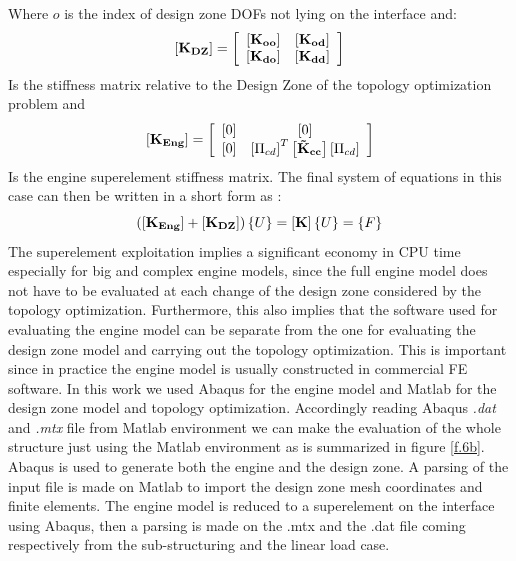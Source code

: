 Where $o$ is the index of design zone DOFs not lying on the interface and:
\begin{equation}
\left[{\mathbf{K_{DZ}}}\right]=\left[ \begin{array}{cc}
    \left[ \mathbf{K_{oo}} \right] & \left[ \mathbf{K_{od}} \right]\\
    \left[ \mathbf{K_{do}} \right] & \left[ \mathbf{K_{dd}} \right] 
    \end{array} \right] 
\end{equation}
Is the stiffness matrix relative to the Design Zone of the topology optimization problem and
\begin{equation}
\left[{\mathbf{K_{Eng}}}\right]=\left[ \begin{array}{cc}
    \left[ 0 \right] & \left[ 0 \right]\\
    \left[ 0 \right] & \left[ \Pi_{cd} \right]^T\left[ \mathbf{\tilde{K}_{cc}} \right]\left[ \Pi_{cd} \right] 
    \end{array} \right] 
\end{equation} 
Is the engine superelement stiffness matrix.
The final system of equations in this case can then be written in a short form as :
\begin{equation}
\left(\left[{\mathbf{K_{Eng}}}\right]+\left[{\mathbf{K_{DZ}}}\right]\right)\left\lbrace{U}\right \rbrace=\left[{\mathbf{K}}\right]\left\lbrace{U}\right \rbrace=\left\lbrace{F}\right \rbrace
\end{equation}
The superelement exploitation implies a significant economy in CPU time especially for big and complex engine models, since the full engine model does not have to be evaluated at each change of the design zone considered by the topology optimization. Furthermore, this also implies that the software used for evaluating the engine model can be separate from the one for evaluating the design zone model and carrying out the topology optimization. This is important since in practice the engine model is usually constructed in commercial FE software. In this work we used Abaqus for the engine model and Matlab for the design zone model and topology optimization. Accordingly reading Abaqus \textit{.dat} and \textit{.mtx} file from Matlab environment we can make the evaluation of the whole structure just using the Matlab environment as is summarized in figure \ref{f.6b}. Abaqus is used to generate both the engine and the design zone. A parsing of the input file is made on Matlab to import the design zone mesh coordinates and finite elements. The engine model is reduced to a superelement on the interface using Abaqus, then a parsing is made on the .mtx and the .dat file coming respectively from the sub-structuring and the linear load case. 
